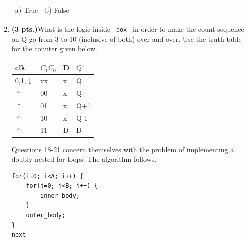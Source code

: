 \documentclass{article}
\begin{document}
\begin{enumerate}
\begin{tabular}{p{1.75in}p{1.75in}}
a) True & b) False \\
\end{tabular}

\item {\bf (3 pts.)}What is the logic inside \verb+ box + in order
to make the count sequence on Q go from 3 to 10 (inclusive of both)
over and over.  Use the truth table for the counter given below.




\begin{tabular}{l|l|l||l}
clk             & $C_1 C_0$     & D & $Q^+$     \\ \hline
0,1,$\downarrow$& xx            & x & Q         \\ \hline
$\uparrow$      & 00            & x & Q         \\  \hline
$\uparrow$      & 01            & x & Q+1       \\  \hline
$\uparrow$      & 10            & x & Q-1       \\  \hline
$\uparrow$      & 11            & D & D         \\
\end{tabular} 



\pagebreak
Questions 18-21 concern themselves with the problem of 
implementing a doubly nested for loops.  The algorithm
follows.


\begin{verbatim}
for(i=0; i<A; i++) {
    for(j=0; j<B; j++) {
        inner_body;
    }
    outer_body;
}
next
\end{verbatim}


\end{enumerate}
\end{document}

